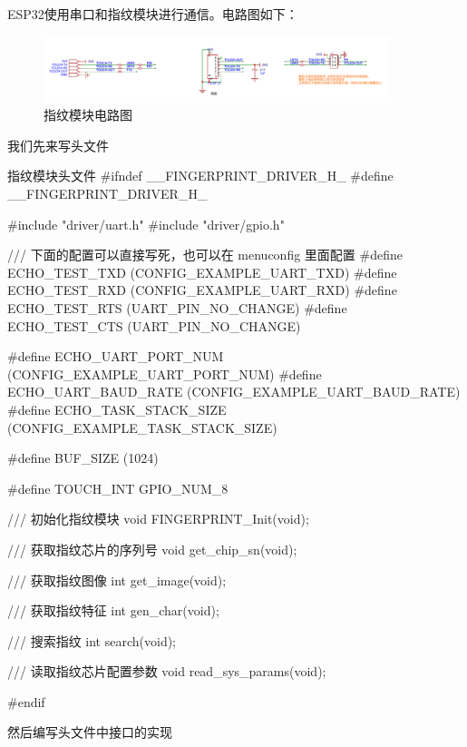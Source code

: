 \documentclass[lang=cn,newtx,10pt,scheme=chinese]{elegantbook}
\begin{document}
ESP32使用串口和指纹模块进行通信。电路图如下：

\begin{figure}[!htb]
\centering
\includegraphics[width=0.9\textwidth]{fingerprint.png}
\caption{指纹模块电路图}
\end{figure}

我们先来写头文件

\begin{mycode}{指纹模块头文件}
#ifndef __FINGERPRINT_DRIVER_H_
#define __FINGERPRINT_DRIVER_H_

#include "driver/uart.h"
#include "driver/gpio.h"

/// 下面的配置可以直接写死，也可以在 menuconfig 里面配置
#define ECHO_TEST_TXD (CONFIG_EXAMPLE_UART_TXD)
#define ECHO_TEST_RXD (CONFIG_EXAMPLE_UART_RXD)
#define ECHO_TEST_RTS (UART_PIN_NO_CHANGE)
#define ECHO_TEST_CTS (UART_PIN_NO_CHANGE)

#define ECHO_UART_PORT_NUM (CONFIG_EXAMPLE_UART_PORT_NUM)
#define ECHO_UART_BAUD_RATE (CONFIG_EXAMPLE_UART_BAUD_RATE)
#define ECHO_TASK_STACK_SIZE (CONFIG_EXAMPLE_TASK_STACK_SIZE)

#define BUF_SIZE (1024)

#define TOUCH_INT GPIO_NUM_8

/// 初始化指纹模块
void FINGERPRINT_Init(void);

/// 获取指纹芯片的序列号
void get_chip_sn(void);

/// 获取指纹图像
int get_image(void);

/// 获取指纹特征
int gen_char(void);

/// 搜索指纹
int search(void);

/// 读取指纹芯片配置参数
void read_sys_params(void);

#endif
\end{mycode}

然后编写头文件中接口的实现
\end{document}
